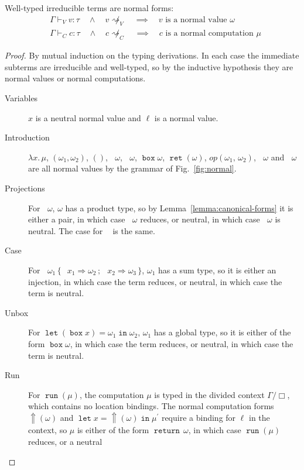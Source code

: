 \documentclass[acmsmall, screen, review, anonymous]{acmart}
\theoremstyle{definition}
\newcommand{\reflectname}{\mathord{\Uparrow}}
\newcommand{\performraw}[2]{\mathop{\reflectname(#1(#2))}}
\newcommand{\perform}[3]{\performraw{#1}{#2}(#3)}
\newcommand{\loc}{\ell}
\newcommand{\outlname}{\mathtt{out}_L}
\newcommand{\outl}[1]{\mathop{\outlname} #1}
\newcommand{\outrname}{\mathtt{out}_R}
\newcommand{\outr}[1]{\mathop{\outrname} #1}
\newcommand{\indintro}[3]{{#1}(#2,\, #3)}
\newcommand{\retname}{\mathtt{ret}}
\newcommand{\ret}[1]{\mathop{\retname}(#1)}
\newcommand{\seq}{\,;\,}
\newcommand{\fstname}{\mathop{\pi_1}}
\newcommand{\fst}[1]{\fstname #1}
\newcommand{\sndname}{\mathop{\pi_2}}
\newcommand{\inlname}{\mathop{\mathtt{in}_L}}
\newcommand{\inl}[1]{\inlname #1}
\newcommand{\inrname}{\mathop{\mathtt{in}_R}}
\newcommand{\inr}[1]{\inrname #1}
\newcommand{\casename}{\mathtt{case}}
\newcommand{\casemname}{\casename^{m}}
\newcommand{\casem}[5]{\mathop{\casemname} #1 \,\{\,\inl{#2} \Rightarrow #3 \seq \inr{#4} \Rightarrow #5 \,\}}
\newcommand{\types}{\mathrel{:}}
\newcommand{\abs}[2]{\lambda#1.\,#2}
\newcommand{\cdiv}[1]{#1/\Box}
\newcommand{\returnname}{\mathop{\mathtt{return}}}
\newcommand{\return}[1]{\returnname\, #1}
\newcommand{\letvname}{\mathop{\mathtt{let}}}
\newcommand{\letv}[3]{\letvname #1 = #2 \mathop{\mathtt{in}} #3}
\newcommand{\gboxname}{\mathop{\mathtt{box}}}
\newcommand{\gbox}[1]{\gboxname #1}
\newcommand{\gunbox}[3]{\mathop{\mathtt{let}} (\gbox{#1}) = #2 \mathop{\mathtt{in}} #3}
\newcommand{\grunname}{\mathtt{run}}
\newcommand{\grun}[1]{\mathop{\grunname}(#1)}
\newcommand{\turnv}{\mathrel{\vdash_V}}
\newcommand{\turnc}{\mathrel{\vdash_C}}
\newcommand{\stepstoname}{\rightsquigarrow}
\newcommand{\stepsnotv}{\not\stepstoname_{V}}
\newcommand{\stepsnotc}{\not\stepstoname_{C}}
\begin{document}
\begin{lemma}[Progress]
\label{lemma:progress}
  Well-typed irreducible terms are normal forms:
  \begin{align*}
    &\Gamma \turnv v \types \tau
      \quad \wedge \quad v \stepsnotv
      \quad \implies \quad v \text{ is a normal value } \omega \\
    &\Gamma \turnc c \types \tau
      \quad \wedge \quad c \stepsnotc
      \quad \implies \quad c \text{ is a normal computation } \mu
  \end{align*}
\end{lemma}
\begin{proof}
  By mutual induction on the typing derivations. In each case the
  immediate subterms are irreducible and well-typed, so by the
  inductive hypothesis they are normal values or normal computations.
  \begin{description}
  \item[Variables] $x$ is a neutral normal value and
    $\loc$ is a normal value.
  \item[Introduction] $\abs{x}{\mu}$, $(\omega_1, \omega_2)$,
    $()$, $\inl{\omega}$, $\inr{\omega}$, $\gbox{\omega}$,
    $\ret{\omega}$, $\indintro{op}{\omega_1}{\omega_2}$, $\outl{\omega}$
    and $\outr{\omega}$ are all normal values by the grammar of
    Fig.~\ref{fig:normal}.
  \item[Projections] For $\fst{\omega}$, $\omega$ has a product type,
    so by Lemma~\ref{lemma:canonical-forms} it is either a pair, in
    which case $\fst{\omega}$ reduces, or neutral, in which case
    $\fst{\omega}$ is neutral. The case for $\sndname$ is the same.
  \item[Case] For $\casem{\omega_1}{x_1}{\omega_2}{x_2}{\omega_3}$,
    $\omega_1$ has a sum type, so it is either an injection, in which
    case the term reduces, or neutral, in which case the term is
    neutral.
  \item[Unbox] For $\gunbox{x}{\omega_1}{\omega_2}$, $\omega_1$ has a
    global type, so it is either of the form $\gbox{\omega}$, in which
    case the term reduces, or neutral, in which case the term is
    neutral.
  \item[Run] For $\grun{\mu}$, the computation $\mu$ is typed in the
    divided context $\cdiv{\Gamma}$, which contains no location
    bindings. The normal computation forms $\perform{\loc}{op}{\omega}$
    and $\letv{x}{\perform{\loc}{op}{\omega}}{\mu^{\prime}}$ require a
    binding for $\loc$ in the context, so $\mu$ is either of the form
    $\return{\omega}$, in which case $\grun{\mu}$ reduces, or a neutral

\end{description}
\end{proof}
\end{document}

